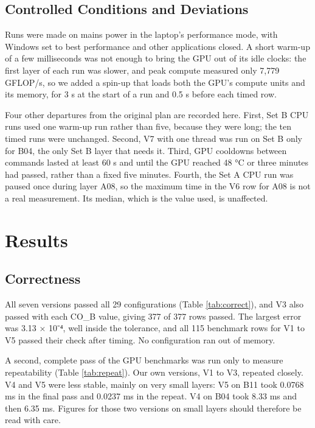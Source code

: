 \documentclass[12pt,a4paper]{article}
\newcommand{\gentable}[3][\small]{%
  \begin{table}[H]\centering{#1}\caption{#3}\end{table}}
\begin{document}
\gentable{tuning}{V3 kernel time for each CO\_B value\label{tab:tuning}}

\subsection{Controlled Conditions and Deviations}
Runs were made on mains power in the laptop's performance mode, with Windows set to best performance and other applications closed. A short warm-up of a few milliseconds was not enough to bring the GPU out of its idle clocks: the first layer of each run was slower, and peak compute measured only 7,779 GFLOP/s, so we added a spin-up that loads both the GPU's compute units and its memory, for 3 s at the start of a run and 0.5 s before each timed row.

Four other departures from the original plan are recorded here. First, Set B CPU runs used one warm-up run rather than five, because they were long; the ten timed runs were unchanged. Second, V7 with one thread was run on Set B only for B04, the only Set B layer that needs it. Third, GPU cooldowns between commands lasted at least 60 s and until the GPU reached 48 °C or three minutes had passed, rather than a fixed five minutes. Fourth, the Set A CPU run was paused once during layer A08, so the maximum time in the V6 row for A08 is not a real measurement. Its median, which is the value used, is unaffected.

\section{Results}
\subsection{Correctness}
All seven versions passed all 29 configurations (Table \ref{tab:correct}), and V3 also passed with each CO\_B value, giving 377 of 377 rows passed. The largest error was 3.13 × 10⁻⁴, well inside the tolerance, and all 115 benchmark rows for V1 to V5 passed their check after timing. No configuration ran out of memory.

\gentable{correctness}{Correctness over all 29 configurations\label{tab:correct}}

A second, complete pass of the GPU benchmarks was run only to measure repeatability (Table \ref{tab:repeat}). Our own versions, V1 to V3, repeated closely. V4 and V5 were less stable, mainly on very small layers: V5 on B11 took 0.0768 ms in the final pass and 0.0237 ms in the repeat. V4 on B04 took 8.33 ms and then 6.35 ms. Figures for those two versions on small layers should therefore be read with care.
\end{document}
